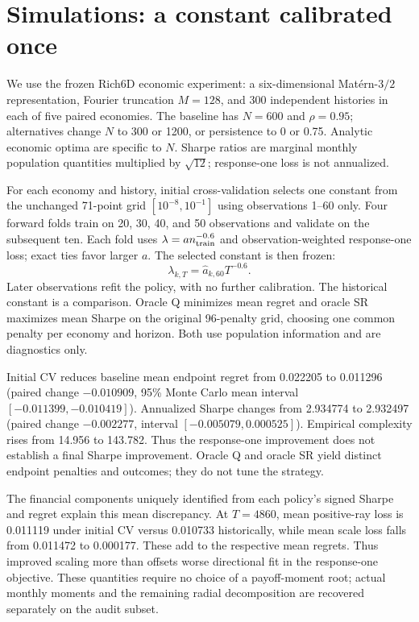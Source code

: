 \section{Simulations: a constant calibrated once}
\label{sec:simulations}
We use the frozen Rich6D economic experiment: a six-dimensional Mat\'ern-$3/2$ representation, Fourier truncation $M=128$, and 300 independent histories in each of five paired economies. The baseline has $N=600$ and $\rho=0.95$; alternatives change $N$ to 300 or 1200, or persistence to 0 or 0.75. Analytic economic optima are specific to $N$. Sharpe ratios are marginal monthly population quantities multiplied by $\sqrt{12}$; response-one loss is not annualized.

For each economy and history, initial cross-validation selects one constant from the unchanged 71-point grid $[10^{-8},10^{-1}]$ using observations 1--60 only. Four forward folds train on 20, 30, 40, and 50 observations and validate on the subsequent ten. Each fold uses $\lambda=a n_{\rm train}^{-0.6}$ and observation-weighted response-one loss; exact ties favor larger $a$. The selected constant is then frozen:
\[
\lambda_{k,T}=\widehat a_{k,60}T^{-0.6}.
\]
Later observations refit the policy, with no further calibration. The historical constant is a comparison. Oracle Q minimizes mean regret and oracle SR maximizes mean Sharpe on the original 96-penalty grid, choosing one common penalty per economy and horizon. Both use population information and are diagnostics only.

\begin{table}[htbp]\centering\small
\caption{Baseline endpoint at $T=4860$, all 300 histories.}

\end{table}

Initial CV reduces baseline mean endpoint regret from 0.022205 to 0.011296 (paired change $-0.010909$, 95\% Monte Carlo mean interval $[-0.011399,-0.010419]$). Annualized Sharpe changes from 2.934774 to 2.932497 (paired change $-0.002277$, interval $[-0.005079,0.000525]$). Empirical complexity rises from 14.956 to 143.782. Thus the response-one improvement does not establish a final Sharpe improvement. Oracle Q and oracle SR yield distinct endpoint penalties and outcomes; they do not tune the strategy.

The financial components uniquely identified from each policy's signed Sharpe and regret explain this mean discrepancy. At $T=4860$, mean positive-ray loss is 0.011119 under initial CV versus 0.010733 historically, while mean scale loss falls from 0.011472 to 0.000177. These add to the respective mean regrets. Thus improved scaling more than offsets worse directional fit in the response-one objective. These quantities require no choice of a payoff-moment root; actual monthly moments and the remaining radial decomposition are recovered separately on the audit subset.

